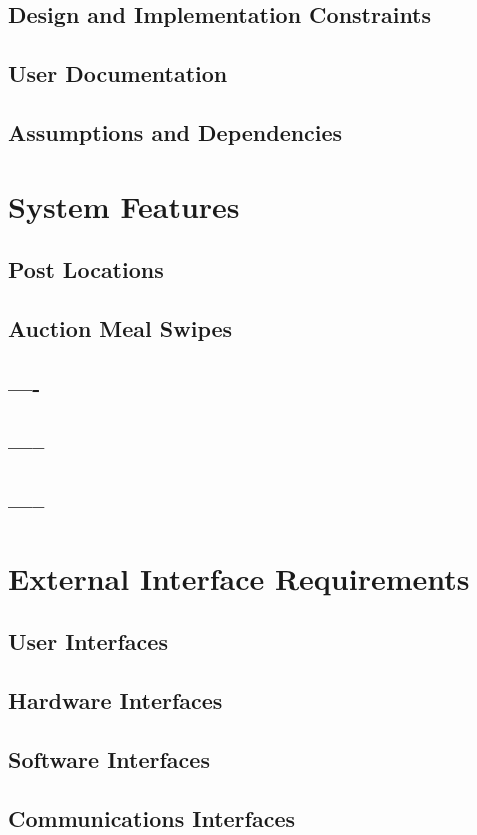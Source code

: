 \documentclass[12pt]{article}
\begin{document}
\subsection{Design and Implementation Constraints}
\subsection{User Documentation}
\subsection{Assumptions and Dependencies}

\section{System Features}
\subsection{Post Locations}
\subsection{Auction Meal Swipes}
\subsection{----}
\subsection{-----}
\subsection{-----}

\section{External Interface Requirements}
\subsection{User Interfaces}
\subsection{Hardware Interfaces}
\subsection{Software Interfaces}
\subsection{Communications Interfaces}
\end{document}
